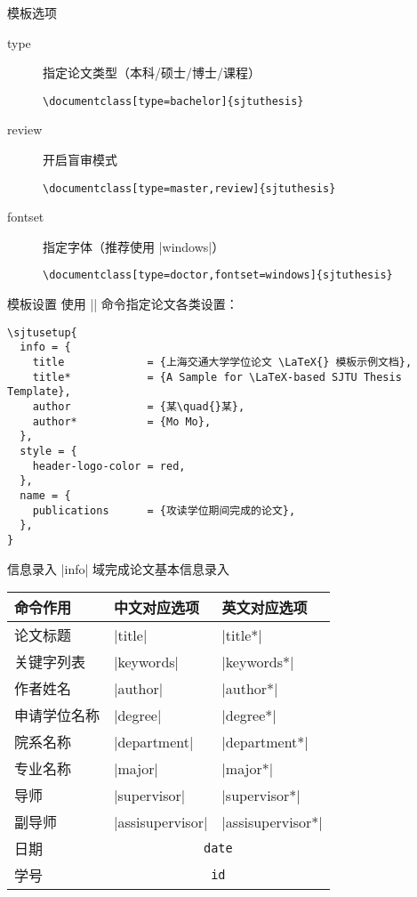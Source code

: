 \begin{frame}[fragile]{模板选项}
\begin{description}
\item[type] 指定论文类型（本科/硕士/博士/课程）
  \begin{lstlisting}[basicstyle=\ttfamily]
\documentclass[type=bachelor]{sjtuthesis}
  \end{lstlisting}
\item[review] 开启盲审模式
  \begin{lstlisting}[basicstyle=\ttfamily]
\documentclass[type=master,review]{sjtuthesis}
  \end{lstlisting}
\item[fontset] 指定字体（推荐使用 |windows|）
  \begin{lstlisting}[basicstyle=\ttfamily]
\documentclass[type=doctor,fontset=windows]{sjtuthesis}
  \end{lstlisting}
\end{description}
\end{frame}

\begin{frame}[fragile]{模板设置}
  使用 |\sjtusetup| 命令指定论文各类设置：
  \begin{lstlisting}
\sjtusetup{
  info = {
    title             = {上海交通大学学位论文 \LaTeX{} 模板示例文档},
    title*            = {A Sample for \LaTeX-based SJTU Thesis Template},
    author            = {某\quad{}某},
    author*           = {Mo Mo},
  },
  style = {
    header-logo-color = red,
  },
  name = {
    publications      = {攻读学位期间完成的论文},
  },
}
  \end{lstlisting}
\end{frame}

\begin{frame}[fragile]{信息录入}
  |info| 域完成论文基本信息录入
  \begin{table}[h]
    \centering
    \footnotesize
    \begin{tabular}{lll} \toprule
      命令作用 & 中文对应选项 & 英文对应选项 \\ \midrule
      论文标题 & |title| & |title*| \\
      关键字列表 & |keywords| & |keywords*| \\
      作者姓名&  |author| &|author*|\\
      申请学位名称 & |degree|&|degree*|\\
      院系名称 & |department| & |department*|\\
      专业名称 & |major| & |major*|\\
      导师 & |supervisor| & |supervisor*|\\
      副导师 & |assisupervisor| & |assisupervisor*|\\
      日期 & \multicolumn{2}{c}{\texttt{date}}\\
      学号 & \multicolumn{2}{c}{\texttt{id}}\\ \bottomrule
      \end{tabular}
  \end{table}
\end{frame}

